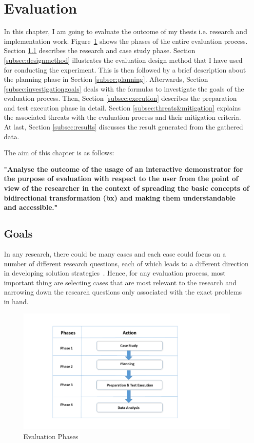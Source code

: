 \section{Evaluation}\label{sec:evaluation} 
In this chapter, I am going to evaluate the outcome of my thesis i.e. research and implementation work. 
Figure~\ref{fig:Evaluation_Phases} shows the phases of the entire evaluation process. Section \ref{subsec:goals} describes the research and case study phase. Section \ref{subsec:designmethod} illustrates the evaluation design method that I have used for conducting the experiment. This is then followed by a brief description about the planning phase in Section \ref{subsec:planning}. Afterwards, Section \ref{subsec:investigationgoals} deals with the formulas to investigate the goals of the evaluation process. Then, Section \ref{subsec:execution} describes the preparation and test execution phase in detail. Section \ref{subsec:threats&mitigation} explains the associated threats with the evaluation process and their mitigation criteria. At last, Section \ref{subsec:results} discusses the result generated from the gathered data. 

The aim of this chapter is as follows: 

\textbf{"Analyse the outcome of the usage of an interactive demonstrator for the purpose of evaluation with respect to the user from the point of view of the researcher in the context of spreading the basic concepts of bidirectional transformation (bx) and making them understandable and accessible."}

\subsection{Goals}\label{subsec:goals}  
In any research, there could be many cases and each case could focus on a number of different research questions, each of which leads to a different direction in developing solution strategies~\cite{semethods}. Hence, for any evaluation process, most important thing are selecting cases that are most relevant to the research and narrowing down the research questions only associated with the exact problems in hand. 

\begin{figure}
	\includegraphics[width=1\textwidth]{figures/Evaluation_Phases}
	\caption{Evaluation Phases}
	\label{fig:Evaluation_Phases}
\end{figure}


